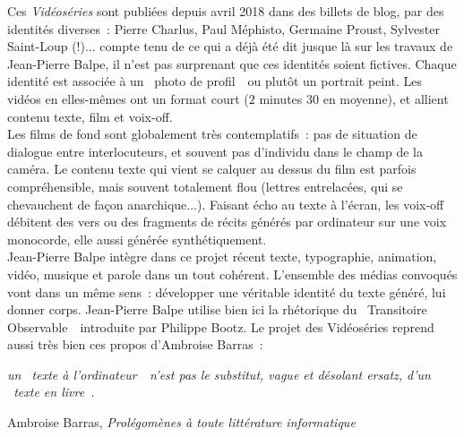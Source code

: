 \documentclass{article}
\newenvironment{citationbox}
{\begin{center}
		\begin{minipage}{.8\textwidth}
		}
		{
		\end{minipage}	
\end{center}
}
\begin{document}
				Ces  \textit{Vidéoséries} sont publiées depuis avril 2018 dans des billets de blog, par des identités diverses : Pierre Charlus, Paul Méphisto, Germaine Proust, Sylvester Saint-Loup (!)... compte tenu de ce qui a déjà été dit jusque là sur les travaux de Jean-Pierre Balpe, il n'est pas surprenant que ces identités soient fictives.    Chaque identité est associée à un \guillemotleft~photo de profil~\guillemotright~ou plutôt un portrait peint. Les vidéos en elles-mêmes ont un format court ($2$ minutes $30$ en moyenne), et allient contenu texte, film et voix-off.\\
				
				Les films de fond sont globalement très contemplatifs : pas de situation de dialogue entre interlocuteurs, et souvent pas d'individu dans le champ de la caméra. Le contenu texte qui vient se calquer au dessus du film est parfois compréhensible, mais souvent totalement flou (lettres entrelacées, qui se chevauchent de façon anarchique...). Faisant écho au texte à l'écran, les voix-off débitent des vers ou des fragments de récits générés par ordinateur sur une voix monocorde, elle aussi générée synthétiquement.\\
				
				Jean-Pierre Balpe intègre dans ce projet récent texte, typographie, animation, vidéo, musique et parole dans un tout cohérent. L'ensemble des médias convoqués vont dans un même sens~: développer une véritable identité du texte généré, lui donner corps. Jean-Pierre Balpe utilise bien ici la rhétorique du \guillemotleft~Transitoire Observable~\guillemotright~introduite par Philippe Bootz. Le projet des Vidéoséries reprend aussi très bien ces propos d'Ambroise Barras~:
				\begin{citationbox}
					\textit{un \guillemotleft~texte à
						l'ordinateur~\guillemotright~n'est pas le substitut, vague et désolant ersatz, d'un \guillemotleft~texte en
						livre~\guillemotright.}
					\begin{flushright}
						Ambroise Barras, \textit{Prolégomènes à toute littérature informatique} \autocite{barras1995}
					\end{flushright}
				\end{citationbox}
				
\end{document}
